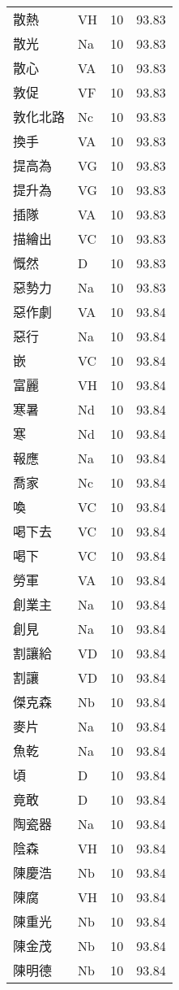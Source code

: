 \documentclass[twocolumn]{book}
\begin{document}
\begin{supertabular}{llrr}
散熱 & VH & 10 &  93.83\\
散光 & Na & 10 &  93.83\\
散心 & VA & 10 &  93.83\\
敦促 & VF & 10 &  93.83\\
敦化北路 & Nc & 10 &  93.83\\
換手 & VA & 10 &  93.83\\
提高為 & VG & 10 &  93.83\\
提升為 & VG & 10 &  93.83\\
插隊 & VA & 10 &  93.83\\
描繪出 & VC & 10 &  93.83\\
慨然 & D & 10 &  93.83\\
惡勢力 & Na & 10 &  93.83\\
惡作劇 & VA & 10 &  93.84\\
惡行 & Na & 10 &  93.84\\
嵌 & VC & 10 &  93.84\\
富麗 & VH & 10 &  93.84\\
寒暑 & Nd & 10 &  93.84\\
寒 & Nd & 10 &  93.84\\
報應 & Na & 10 &  93.84\\
喬家 & Nc & 10 &  93.84\\
喚 & VC & 10 &  93.84\\
喝下去 & VC & 10 &  93.84\\
喝下 & VC & 10 &  93.84\\
勞軍 & VA & 10 &  93.84\\
創業主 & Na & 10 &  93.84\\
創見 & Na & 10 &  93.84\\
割讓給 & VD & 10 &  93.84\\
割讓 & VD & 10 &  93.84\\
傑克森 & Nb & 10 &  93.84\\
麥片 & Na & 10 &  93.84\\
魚乾 & Na & 10 &  93.84\\
頃 & D & 10 &  93.84\\
竟敢 & D & 10 &  93.84\\
陶瓷器 & Na & 10 &  93.84\\
陰森 & VH & 10 &  93.84\\
陳慶浩 & Nb & 10 &  93.84\\
陳腐 & VH & 10 &  93.84\\
陳重光 & Nb & 10 &  93.84\\
陳金茂 & Nb & 10 &  93.84\\
陳明德 & Nb & 10 &  93.84\\

\end{supertabular}
\end{document}
